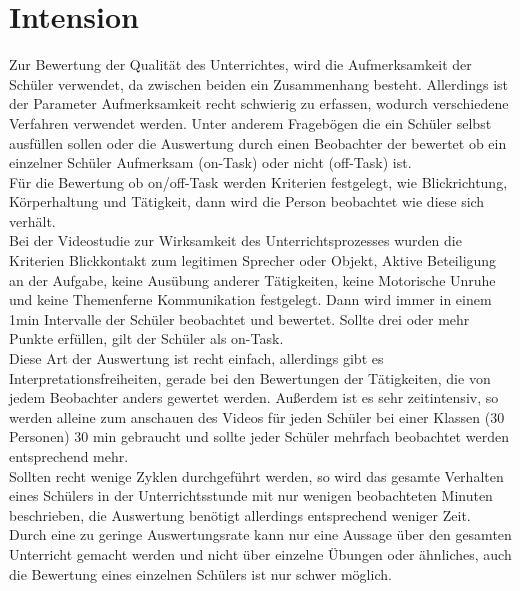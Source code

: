 \section{Intension}
\label{intension}
Zur Bewertung der Qualität des Unterrichtes, wird die Aufmerksamkeit der Schüler verwendet, da zwischen beiden ein Zusammenhang besteht. Allerdings ist der Parameter Aufmerksamkeit recht schwierig zu erfassen, wodurch verschiedene Verfahren verwendet werden. Unter anderem Fragebögen die ein Schüler selbst ausfüllen sollen oder die Auswertung durch einen Beobachter der bewertet ob ein einzelner Schüler Aufmerksam (on-Task) oder nicht (off-Task) ist.\\
Für die Bewertung ob on/off-Task werden Kriterien festgelegt, wie Blickrichtung, Körperhaltung und Tätigkeit, dann wird die Person beobachtet wie diese sich verhält.\\
Bei der Videostudie zur Wirksamkeit des Unterrichtsprozesses \cite{aufmerksamkeit_Studie} wurden die Kriterien Blickkontakt zum legitimen Sprecher oder Objekt, Aktive Beteiligung an der Aufgabe, keine Ausübung anderer Tätigkeiten, keine Motorische Unruhe und keine Themenferne Kommunikation festgelegt. Dann wird immer in einem 1min Intervalle der Schüler beobachtet und bewertet. Sollte drei oder mehr Punkte erfüllen, gilt der Schüler als on-Task.\\
Diese Art der Auswertung ist recht einfach, allerdings gibt es Interpretationsfreiheiten, gerade bei den Bewertungen der Tätigkeiten, die von jedem Beobachter anders gewertet werden. Außerdem ist es sehr zeitintensiv, so werden alleine zum anschauen des Videos für jeden Schüler bei einer Klassen (30 Personen) 30 min gebraucht und sollte jeder Schüler mehrfach beobachtet werden entsprechend mehr.\\
Sollten recht wenige Zyklen durchgeführt werden, so wird das gesamte Verhalten eines Schülers in der Unterrichtsstunde mit nur wenigen beobachteten Minuten beschrieben, die Auswertung benötigt allerdings entsprechend weniger Zeit.\\
Durch eine zu geringe Auswertungsrate kann nur eine Aussage über den gesamten Unterricht gemacht werden und nicht über einzelne Übungen oder ähnliches, auch die Bewertung eines einzelnen Schülers ist nur schwer möglich.
\cite{aufmerksamkeit_Studie}
